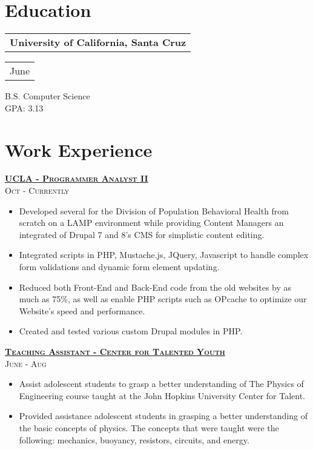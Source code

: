 \documentclass{Resume_Latex_Class}
\begin{document}
\begin{multicols}{2}

\section{Education}
\begin{tabular}[t]{@{}l} 
	{\textbf{University of California, Santa Cruz}}
\end{tabular}
\hfill%
\begin{tabular}[t]{l@{}}
 	{\footnotesize{June \textquotesingle16}}\medskip\\
\end{tabular}
B.S. Computer Science\\
GPA: 3.13

\section{Work Experience}

{\raggedleft\large\textsc\underline{\textbf{UCLA - Programmer Analyst II}}}\\
{\raggedleft\footnotesize\textsc{Oct  - Currently}}
\begin{itemize}[wide=0pt]
\item Developed several for the Division of Population Behavioral Health from scratch on a LAMP environment while providing Content Managers an integrated of Drupal 7 and 8's CMS for simplistic content editing. 
\item Integrated scripts in PHP, Mustache.js, JQuery, Javascript to handle complex form validations and dynamic form element updating. 
\item Reduced both Front-End and Back-End code from the old websites by as much as 75\%, as well as enable PHP scripts such as OPcache to optimize our Website's speed and performance.
\item Created and tested various custom Drupal modules in PHP.
\end{itemize}


\bigskip\medskip


{\raggedleft\large\textsc\underline{\textbf{Teaching Assistant - Center for Talented Youth}}}\\
{\raggedleft\footnotesize\textsc{June - Aug }}
\begin{itemize}[wide=0pt]
\item Assist adolescent students to grasp a better understanding of The Physics of Engineering course taught at the John Hopkins University Center for Talent.
\item Provided assistance adolescent students in grasping a better understanding of the basic concepts of physics. The concepts that were taught were the following: mechanics, buoyancy, resistors, circuits, and energy.
\end{itemize}


\end{multicols}
\end{document}
